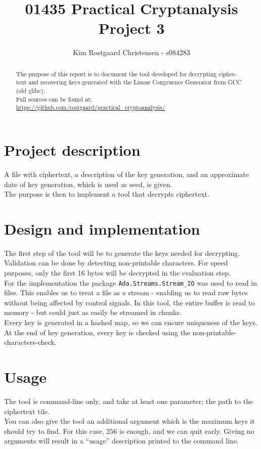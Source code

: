 \documentclass[10pt,a4paper]{article}
\title{01435 Practical Cryptanalysis\\Project 3}
\author{Kim Rostgaard Christensen - s084283}
\def\Code#1{\texttt{#1}}
\begin{document}
\maketitle
\begin{abstract}
The purpose of this report is to document the tool developed for decrypting cipher-text and recovering keys generated with the Linear Congruence Generator from GCC (old glibc).\\
Full sources can be found at:\\
 \url{https://github.com/rostgaard/practical_cryptoanalysis/}
\end{abstract}

\section*{Project description}
A file with ciphertext, a description of the key generation, and an approximate date of key generation, which is used as seed, is given.\\
The purpose is then to implement a tool that decrypts ciphertext.

\section*{Design and implementation}
The first step of the tool will be to generate the keys needed for decrypting. Validation can be done by detecting non-printable characters. For speed purposes, only the first 16 bytes will be decrypted in the evaluation step.\\
For the implementation the package \Code{Ada.Streams.Stream\_IO} was used to read in files. This enables us to treat a file as a stream - enabling us to read raw bytes without being affected by control signals. In this tool, the entire buffer is read to memory - but could just as easily be streamed in chunks.\\
Every key is generated in a hashed map, so we can ensure uniqueness of the keys. At the end  of key generation, every key is checked using the non-printable-characters-check.
\section*{Usage}
The tool is command-line only, and take at least one parameter; the path to the ciphertext tile.\\
You can also give the tool an additional argument which is the maximum keys it should try to find. For this case, 256 is enough, and we can quit early. Giving no arguments will result in a ``usage'' description printed to the command line.
\end{document}
